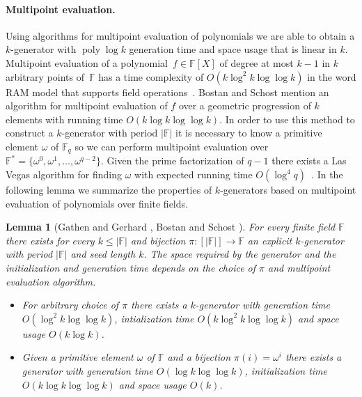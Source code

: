 \documentclass[a4paper,11pt]{article}
\theoremstyle{plain}
\newtheorem{lemma}{Lemma}
\theoremstyle{definition}
\newcommand{\F}{\mathbb{F}}
\DeclareMathOperator{\poly}{poly}
\begin{document}
\paragraph{Multipoint evaluation.}
Using algorithms for multipoint evaluation of polynomials we are able to obtain a \mbox{$k$-generator} with $\poly \log k$ generation time and space usage that is linear in $k$. 
Multipoint evaluation of a polynomial~${f \in \F[X]}$ of degree at most $k-1$ in $k$ arbitrary points of~$\F$ has a time complexity of $O(k \log^{2} k \log \log k)$ in the word RAM model that supports field operations~\mbox{\cite[Corollary 10.8]{gathen2013}}. 
Bostan and Schost \cite{bostan2005} mention an algorithm for multipoint evaluation of $f$ over a geometric progression of $k$ elements with running time $O(k \log k \log \log k)$. 
In order to use this method to construct a $k$-generator with period $|\F|$ 
it is necessary to know a primitive element $\omega$ of $\F_{q}$ so we can perform multipoint evaluation over $\F^{*} = \{\omega^{0}, \omega^{1}, \dots, \omega^{q-2} \}$. 
Given the prime factorization of $q - 1$ there exists a Las Vegas algorithm for finding $\omega$ with expected running time $O(\log^{4} q)$~\mbox{\cite[Chapter 11]{shoup2009}}. 
In the following lemma we summarize the properties of $k$-generators based on multipoint evaluation of polynomials over finite fields.         

\begin{lemma}[{Gathen and Gerhard \cite[Corollary 10.8]{gathen2013}, Bostan and Schost \cite{bostan2005}}] \label{lem:multipoint}
For every finite field $\F$ there exists for every $k \leq |\F|$ and bijection $\pi : [|\F|] \to \F$ an explicit $k$-generator with period $|\F|$ and seed length $k$.
The space required by the generator and the initialization and generation time depends on the choice of $\pi$ and multipoint evaluation algorithm.
\begin{itemize}
\item[--] For arbitrary choice of $\pi$ there exists a $k$-generator with generation time $O(\log^{2} k \log \log k)$, intialization time $O(k \log^{2} k \log \log k)$ and space usage $O(k \log k)$. 
\item[--] Given a primitive element $\omega$ of $\F$ and a bijection $\pi(i) = \omega^{i}$ there exists a generator with generation time $O(\log k \log \log k)$, initialization time $O(k \log k \log \log k)$ and space usage $O(k)$.
\end{itemize}
\end{lemma}
\end{document}
